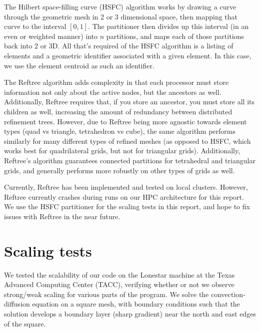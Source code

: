\documentclass{article}
\begin{document}
The Hilbert space-filling curve (HSFC) algorithm works by drawing a curve through the geometric mesh in 2 or 3 dimensional space, then mapping that curve to the interval $[0,1]$. The partitioner then divides up this interval (in an even or weighted manner) into $n$ partitions, and maps each of those partitions back into 2 or 3D. All that's required of the HSFC algorithm is a listing of elements and a geometric identifier associated with a given element. In this case, we use the element centroid as such an identifier. 

The Reftree algorithm \cite{REFTREE} adds complexity in that each processor must store information not only about the active nodes, but the ancestors as well. Additionally, Reftree requires that, if you store an ancestor, you must store all its children as well, increasing the amount of redundancy between distributed refinement trees. However, due to Reftree being more agnostic towards element types (quad vs triangle, tetrahedron vs cube), the same algorithm performs similarly for many different types of refined meshes (as opposed to HSFC, which works best for quadrilateral grids, but not for triangular grids).  Additionally, Reftree's algorithm guarantees connected partitions for tetrahedral and triangular grids, and generally performs more robustly on other types of grids as well.  

Currently, Reftree has been implemented and tested on local clusters. However, Reftree currently crashes during runs on our HPC architecture for this report. We use the HSFC partitioner for the scaling tests in this report, and hope to fix issues with Reftree in the near future. 

\section{Scaling tests}\label{sec:NumericalExperiments}

We tested the scalability of our code on the Lonestar machine at the Texas Advanced Computing Center (TACC), verifying whether or not we observe strong/weak scaling for various parts of the program.  We solve the convection-diffusion equation on a square mesh, with boundary conditions such that the solution develops a boundary layer (sharp gradient) near the north and east edges of the square.  
\end{document}
